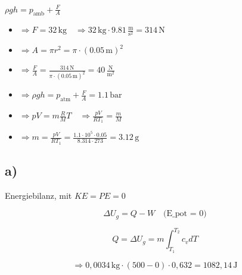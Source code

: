 

\item[a)] \(\rho g h = p_{\text{amb}} + \frac{F}{A}\)
    \begin{itemize}
        \item \(\Rightarrow F = 32 \, \text{kg} \quad \Rightarrow 32 \, \text{kg} \cdot 9.81 \, \frac{\text{m}}{\text{s}^2} = 314 \, \text{N}\)
        \item \(\Rightarrow A = \pi r^2 = \pi \cdot (0.05 \, \text{m})^2\)
        \item \(\Rightarrow \frac{F}{A} = \frac{314 \, \text{N}}{\pi \cdot (0.05 \, \text{m})^2} = 40 \, \frac{\text{N}}{\text{m}^2}\)
        \item \(\Rightarrow \rho g h = p_{\text{atm}} + \frac{F}{A} = 1.1 \, \text{bar}\)
        \item \(\Rightarrow pV = m \frac{R}{M} T \quad \Rightarrow \frac{pV}{R T_1} = \frac{m}{M}\)
        \item \(\Rightarrow m = \frac{pV}{R T_1} = \frac{1.1 \cdot 10^5 \cdot 0.05}{8.314 \cdot 273} = 3.12 \, \text{g}\)
    \end{itemize}



\subsection*{a)}
Energiebilanz, mit \( KE = PE = 0 \)

\[
\Delta U_g = Q - W \quad \text{(E_{pot} = 0)}
\]

\[
Q = \Delta U_g = m \int_{T_1}^{T_2} c_v dT
\]

\[
\Rightarrow 0,0034 \, \text{kg} \cdot (500 - 0) \cdot 0,632 = 1082,14 \, \text{J}
\]